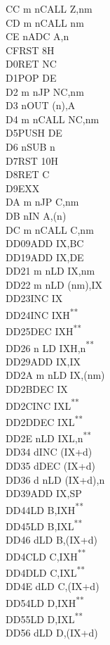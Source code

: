 \documentclass[12pt,twoside,openright,a4paper]{book}
\newcommand{\UNDOC}{\textnormal{\textsuperscript{**}}}
\begin{document}
\begin{multicols}{3}
{\begin{tabbing}
	CC m n\>CALL Z,nm\\
	CD m n\>CALL nm\\
	CE n\>ADC A,n\\
	CF\>RST 8H\\
	D0\>RET NC\\
	D1\>POP DE\\
	D2 m n\>JP NC,nm\\
	D3 n\>OUT (n),A\\
	D4 m n\>CALL NC,nm\\
	D5\>PUSH DE\\
	D6 n\>SUB n\\
	D7\>RST 10H\\
	D8\>RET C\\
	D9\>EXX\\
	DA m n\>JP C,nm\\
	DB n\>IN A,(n)\\
	DC m n\>CALL C,nm\\
	DD09\>ADD IX,BC\\
	DD19\>ADD IX,DE\\
	DD21 m n\>LD IX,nm\\
	DD22 m n\>LD (nm),IX\\
	DD23\>INC IX\\
	DD24\>INC IXH\UNDOC\\
	DD25\>DEC IXH\UNDOC\\
	DD26 n \>LD IXH,n\UNDOC\\
	DD29\>ADD IX,IX\\
	DD2A m n\>LD IX,(nm)\\
	DD2B\>DEC IX\\
	DD2C\>INC IXL\UNDOC\\
	DD2D\>DEC IXL\UNDOC\\
	DD2E n\>LD IXL,n\UNDOC\\
	DD34 d\>INC (IX+d)\\
	DD35 d\>DEC (IX+d)\\
	DD36 d n\>LD (IX+d),n\\
	DD39\>ADD IX,SP\\
	DD44\>LD B,IXH\UNDOC\\
	DD45\>LD B,IXL\UNDOC\\
	DD46 d\>LD B,(IX+d)\\
	DD4C\>LD C,IXH\UNDOC\\
	DD4D\>LD C,IXL\UNDOC\\
	DD4E d\>LD C,(IX+d)\\
	DD54\>LD D,IXH\UNDOC\\
	DD55\>LD D,IXL\UNDOC\\
	DD56 d\>LD D,(IX+d)\\

\end{tabbing}}
\end{multicols}
\end{document}
